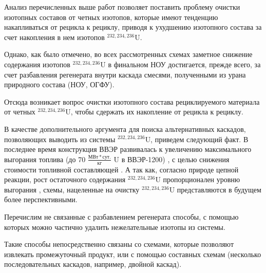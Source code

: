 Анализ перечисленных выше работ позволяет поставить проблему очистки изотопных составов от четных изотопов, которые имеют тенденцию накапливаться от рецикла к рециклу, приводя к ухудшению изотопного состава за счет накопления в нем изотопов $^{232,234,236}$U.

Однако, как было отмечено, во всех рассмотренных схемах заметное снижение содержания изотопов $^{232,234,236}$U в финальном НОУ достигается, прежде всего, за счет разбавления регенерата внутри каскада смесями, полученными из урана природного состава (НОУ, ОГФУ).

Отсюда возникает вопрос очистки изотопного состава рециклируемого материала от четных $^{232,234,236}$U, чтобы сдержать их накопление от рецикла к рециклу.

В качестве дополнительного аргумента для поиска альтернативных каскадов, позволяющих выводить из системы $^{232,234,236}$U, приведем следующий факт.
В последнее время конструкция ВВЭР развивалась к увеличению максимального выгорания топлива (до 70 $\frac{МВт*сут.}{кг}$ U в ВВЭР-1200) \cite{asmolovNewGenerationFirstofthe2017}, с целью снижения стоимости топливной составляющей \cite{andrianovaPovyshenievygoraniyaToplivaVVER2008}.
А так как, согласно природе цепной реакции, рост остаточного содержания $^{232,234,236}$U пропорционален уровню выгорания \cite{VeryHighBurnups2006}, схемы, нацеленные на очистку $^{232,234,236}$U представляются в будущем более перспективными.


Перечислим не связанные с разбавлением регенерата способы, с помощью которых можно частично удалить нежелательные изотопы из системы.

Такие способы непосредственно связаны со схемами, которые позволяют извлекать промежуточный продукт, или с помощью составных схемам (несколько последовательных каскадов, например, двойной каскад).

